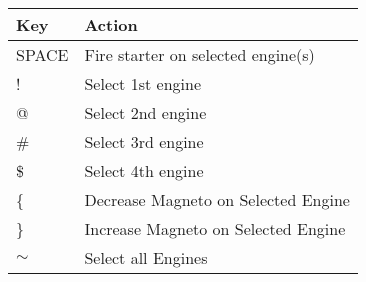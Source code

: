 \begin{tabular}{|l|l|}\hline
Key      &  Action\\ \hline
   SPACE & Fire starter on selected engine(s)\\
   !     & Select 1st engine\\
   @		 & Select 2nd engine\\
  \#     & Select 3rd engine\\
  \$     & Select 4th engine\\
  \{     & Decrease Magneto on Selected Engine\\
  \}     & Increase Magneto on Selected Engine\\
  $\sim$   & Select all Engines\\\hline
\end{tabular}

